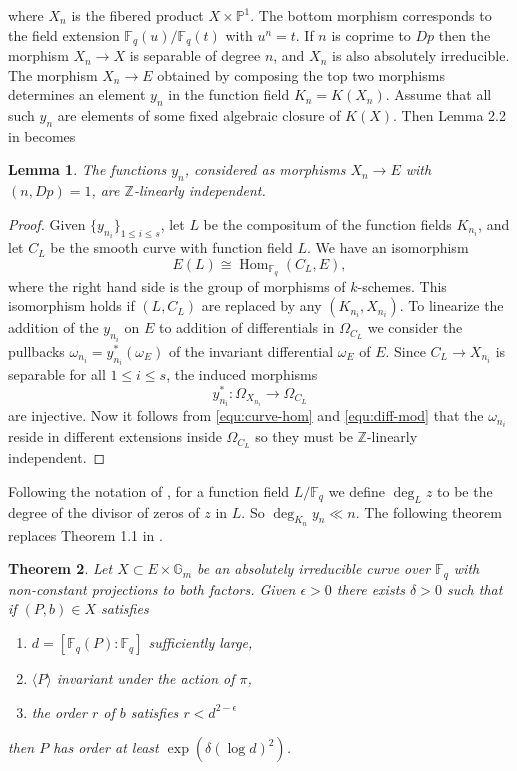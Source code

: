\documentclass[12pt]{article}
\theoremstyle{plain}
\newtheorem{theorem}{Theorem}
\newtheorem{lemma}[theorem]{Lemma}
\theoremstyle{definition}
\newcommand{\ang}[1]{\langle#1\rangle}
\DeclareMathOperator{\Hom}{Hom}
\def\Z{\ensuremath{\mathbb{Z}}}
\def\F{\ensuremath{\mathbb{F}}}
\def\P{\ensuremath{\mathbb{P}}}
\begin{document}
where $X_n$ is the fibered product $X \times \P^1$. The bottom morphism corresponds to the field 
extension $\F_q(u)/\F_q(t)$ with $u^n = t$. If $n$ is coprime to $Dp$ then the morphism $X_n 
\rightarrow X$ is separable of degree $n$, and $X_n$ is also absolutely irreducible. The morphism 
$X_n \rightarrow E$ obtained by composing the top two morphisms determines an element $y_n$ in the 
function field $K_n = K(X_n)$. Assume that all such $y_n$ are elements of some fixed algebraic 
closure of $K(X)$. Then Lemma 2.2 in \cite{voloch2010} becomes
\begin{lemma}
	The functions $y_n$, considered as morphisms $X_n \rightarrow E$ with $(n, Dp) = 1$, are 
	$\Z$-linearly independent.
\end{lemma}
\begin{proof}
	Given $\{y_{n_i}\}_{1 \le i \le s}$, let $L$ be the compositum of the function fields $K_{n_i}$,
	and let $C_L$ be the smooth curve with function field $L$. We have an isomorphism 
	\begin{equation}
	\label{equ:curve-hom}
		E(L) \cong \Hom_{\F_q}(C_L, E),
	\end{equation}
	where the right hand side is the group of morphisms of $k$-schemes. This isomorphism holds if 
	$(L, C_L)$ are replaced by any $(K_{n_i}, X_{n_i})$. To linearize the addition of the $y_{n_i}$ 
	on $E$ to addition of differentials in $\Omega_{C_L}$ we consider the pullbacks $\omega_{n_i} = 
	y_{n_i}^*(\omega_E)$ of the invariant differential $\omega_E$ of $E$. Since $C_L \rightarrow 
	X_{n_i}$ is separable for all $1 \le i \le s$, the induced morphisms
	\begin{equation}
	\label{equ:diff-mod}
	y_{n_i}^*: \Omega_{X_{n_i}} \longrightarrow \Omega_{C_L}
	\end{equation}
	are injective. Now it follows from \eqref{equ:curve-hom} and \eqref{equ:diff-mod} that the 
	$\omega_{n_i}$ reside in different extensions inside $\Omega_{C_L}$ so they must be 
	$\Z$-linearly independent.
\end{proof}
Following the notation of \cite{voloch2010}, for a function field $L/\F_q$ we define $\deg_Lz$ to 
be the degree of the divisor of zeros of $z$ in $L$. So $\deg_{K_n}y_n \ll n$. The following 
theorem replaces Theorem 1.1 in \cite{voloch2010}.
\begin{theorem}
	\label{theo:order-general}
	Let $X \subset E \times \mathbb{G}_m$ be an absolutely irreducible curve over $\F_q$ with 
	non-constant projections to both factors. Given $\epsilon > 0$ there exists $\delta > 0$ such 
	that if $(P, b) \in X$ satisfies
	\begin{enumerate}[leftmargin = *, labelsep = *, align = left, itemsep = -0.1cm, font = 
	\normalfont, label = (\roman*)]
		\item $d = [\F_q(P) : \F_q]$ sufficiently large,
		\item $\ang{P}$ invariant under the action of $\pi$,
		\item the order $r$ of $b$ satisfies $r < d^{2 - \epsilon}$
	\end{enumerate}
	then $P$ has order at least $\exp(\delta (\log d)^2)$.
\end{theorem}
\end{document}
